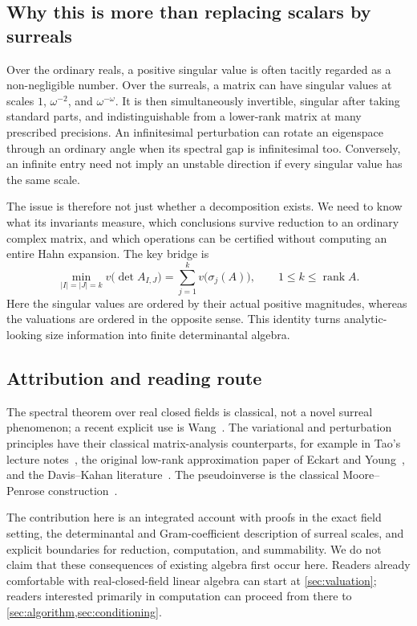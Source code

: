 \documentclass[11pt,a4paper]{article}
\numberwithin{equation}{section}
\theoremstyle{definition}
\theoremstyle{remark}
\newcommand{\rank}{\operatorname{rank}}
\begin{document}
\subsection{Why this is more than replacing scalars by surreals}
Over the ordinary reals, a positive singular value is often tacitly regarded
as a non-negligible number. Over the surreals, a matrix can have singular
values at scales $1$, $\omega^{-2}$, and $\omega^{-\omega}$. It is then
simultaneously invertible, singular after taking standard parts, and
indistinguishable from a lower-rank matrix at many prescribed precisions.
An infinitesimal perturbation can rotate an eigenspace through an ordinary
angle when its spectral gap is infinitesimal too. Conversely, an infinite
entry need not imply an unstable direction if every singular value has the
same scale.

The issue is therefore not just whether a decomposition exists. We need to
know what its invariants measure, which conclusions survive reduction to an
ordinary complex matrix, and which operations can be certified without
computing an entire Hahn expansion. The key bridge is
\begin{equation}\label{eq:introbridge}
 \min_{|I|=|J|=k}v\bigl(\det A_{I,J}\bigr)
   =\sum_{j=1}^k v\bigl(\sigma_j(A)\bigr),
 \qquad 1\le k\le\rank A.
\end{equation}
Here the singular values are ordered by their actual positive magnitudes,
whereas the valuations are ordered in the opposite sense. This identity
turns analytic-looking size information into finite determinantal algebra.

\subsection{Attribution and reading route}
The spectral theorem over real closed fields is classical, not a novel
surreal phenomenon; a recent explicit use is Wang~\cite{Wang}. The
variational and perturbation principles have their classical matrix-analysis
counterparts, for example in Tao's lecture notes~\cite{Tao}, the original
low-rank approximation paper of Eckart and Young~\cite{EY}, and the
Davis--Kahan literature~\cite{DK,YWS}. The pseudoinverse is the classical
Moore--Penrose construction~\cite{Penrose}.

The contribution here is an integrated account with proofs in the exact
field setting, the determinantal and Gram-coefficient description of
surreal scales, and explicit boundaries for reduction, computation, and
summability. We do not claim that these consequences of existing algebra
first occur here. Readers already comfortable with real-closed-field linear
algebra can start at \cref{sec:valuation}; readers interested primarily in
computation can proceed from there to \cref{sec:algorithm,sec:conditioning}.
\end{document}
